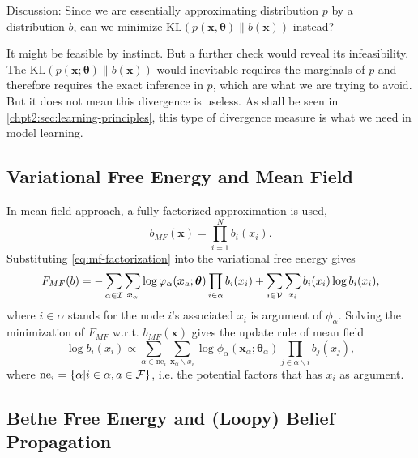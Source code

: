 \begin{remark}
  Discussion: Since we are essentially approximating distribution $p$ by a distribution $b$, can we minimize $\mathrm{KL}(p(\bm{x}, \bm{\theta})\|b(\bm{x}))$ instead?

  It might be feasible by instinct. But a further check would reveal its infeasibility. The $\mathrm{KL}(p(\bm{x}; \bm{\theta})\|b(\bm{x}))$ would inevitable requires the marginals of $p$ and therefore requires the exact inference in $p$, which are what we are trying to avoid. But it does not mean this divergence is useless. As shall be seen in \autoref{chpt2:sec:learning-principles}, this type of divergence measure is what we need in model learning.
\end{remark}



\subsection{Variational Free Energy and Mean Field}

In mean field approach, a fully-factorized approximation is used,
\begin{equation}\label{eq:mf-factorization}
  b_{MF}(\bm{x}) = \prod_{i=1}^{N}b_i(x_i).
\end{equation}
Substituting \eqref{eq:mf-factorization} into the variational free energy gives
\begin{align}
  F_{MF}(b) =  - \sum_{\alpha \in \mathcal{I}}\sum_{\bm{x}_{\alpha}} \log{\varphi_{\alpha}(\bm{x}_{a};\bm{\theta})}
  \prod_{i\in \alpha}b_i(x_i) + \sum_{i \in \mathcal{V}} \sum_{x_i} b_i(x_i) \log{b_i(x_i)},
\end{align}
where $i \in \alpha$ stands for the node $i$'s associated $x_i$ is argument of $\phi_{\alpha}$.
Solving the minimization of $F_{MF}$ w.r.t. $b_{MF}(\bm{x})$ gives the
update rule of mean field
\begin{equation}
  \log{b_i(x_i)} \propto \sum_{\alpha \in \mathrm{ne}_i} \sum_{\bm{x}_{\alpha} \backslash x_i} \log{\phi_{\alpha}}(\bm{x}_{\alpha};\bm{\theta}_{\alpha}) \prod_{j\in {\alpha}\backslash i} b_j(x_j),
\end{equation}
where $\mathrm{ne}_i = \left\{ \alpha | i \in \alpha, a \in \mathcal{F} \right\}$, i.e. the
potential factors that has $x_i$ as argument.

\subsection{Bethe Free Energy and (Loopy) Belief Propagation}


